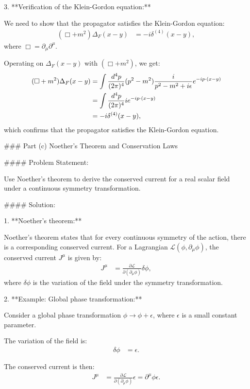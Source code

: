 3. **Verification of the Klein-Gordon equation:**

   We need to show that the propagator satisfies the Klein-Gordon equation:
   \begin{align}
       (\Box + m^2) \Delta_F(x - y) &= -i \delta^{(4)}(x - y),
   \end{align}
   where $\Box = \partial_\mu \partial^\mu$.

   Operating on $\Delta_F(x - y)$ with $(\Box + m^2)$, we get:
   \begin{align}
       (\Box + m^2) \Delta_F(x - y) &= \int \frac{d^4 p}{(2\pi)^4} (p^2 - m^2) \frac{i}{p^2 - m^2 + i\epsilon} e^{-ip \cdot (x - y)} \notag \\
       &= \int \frac{d^4 p}{(2\pi)^4} i e^{-ip \cdot (x - y)} \notag \\
       &= -i \delta^{(4)}(x - y),
   \end{align}
   which confirms that the propagator satisfies the Klein-Gordon equation.

### Part (c) Noether's Theorem and Conservation Laws

#### Problem Statement:

Use Noether's theorem to derive the conserved current for a real scalar field under a continuous symmetry transformation.

#### Solution:

1. **Noether's theorem:**

   Noether's theorem states that for every continuous symmetry of the action, there is a corresponding conserved current. For a Lagrangian $\mathcal{L}(\phi, \partial_\mu \phi)$, the conserved current $J^\mu$ is given by:
   \begin{align}
       J^\mu &= \frac{\partial \mathcal{L}}{\partial (\partial_\mu \phi)} \delta \phi,
   \end{align}
   where $\delta \phi$ is the variation of the field under the symmetry transformation.

2. **Example: Global phase transformation:**

   Consider a global phase transformation $\phi \rightarrow \phi + \epsilon$, where $\epsilon$ is a small constant parameter.

   The variation of the field is:
   \begin{align}
       \delta \phi &= \epsilon.
   \end{align}

   The conserved current is then:
   \begin{align}
       J^\mu &= \frac{\partial \mathcal{L}}{\partial (\partial_\mu \phi)} \epsilon = \partial^\mu \phi \epsilon.
   \end{align}

